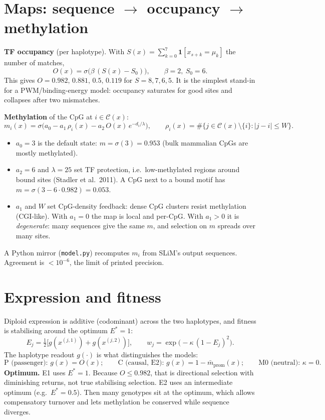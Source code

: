 \documentclass[11pt]{article}
\theoremstyle{definition}
\newcommand{\sig}{\sigma}
\begin{document}
\section{Maps: sequence $\to$ occupancy $\to$ methylation}\label{sec:maps}
\textbf{TF occupancy} (per haplotype). With $S(x)=\sum_{k=0}^{7}\mathbf{1}[x_{s+k}=\mu_k]$ the number of matches,
\begin{equation}
O(x)=\sig\!\big(\beta\,(S(x)-S_0)\big),\qquad \beta=2,\ S_0=6.
\end{equation}
This gives $O=0.982,\,0.881,\,0.5,\,0.119$ for $S=8,7,6,5$. It is the simplest stand-in for a PWM/binding-energy
model: occupancy saturates for good sites and collapses after two mismatches.

\textbf{Methylation} of the CpG at $i\in\mathcal{C}(x)$:
\begin{equation}
m_i(x)=\sig\!\Big(a_0-a_1\,\rho_i(x)-a_2\,O(x)\,e^{-d_i/\lambda}\Big),\qquad
\rho_i(x)=\#\{j\in\mathcal{C}(x)\setminus\{i\}: |j-i|\le W\}.
\label{eq:meth}
\end{equation}
\begin{itemize}
\item $a_0=3$ is the default state: $m=\sig(3)=0.953$ (bulk mammalian CpGs are mostly methylated).
\item $a_2=6$ and $\lambda=25$ set TF protection, i.e.\ low-methylated regions around bound sites (Stadler et al.\ 2011).
  A CpG next to a bound motif has $m=\sig(3-6\cdot0.982)=0.053$.
\item $a_1$ and $W$ set CpG-density feedback: dense CpG clusters resist methylation (CGI-like). With $a_1=0$ the map is
  local and per-CpG. With $a_1>0$ it is \emph{degenerate}: many sequences give the same $m$, and selection on $m$
  spreads over many sites.
\end{itemize}
A Python mirror (\texttt{model.py}) recomputes $m_i$ from SLiM's output sequences. Agreement is $<10^{-6}$, the limit
of printed precision.

\section{Expression and fitness}\label{sec:fit}
Diploid expression is additive (codominant) across the two haplotypes, and fitness is stabilising around the
optimum $E^*=1$:
\begin{equation}
E_j=\tfrac12\big[g(x^{(j,1)})+g(x^{(j,2)})\big],\qquad w_j=\exp\!\big(-\kappa\,(1-E_j)^2\big).
\end{equation}
The haplotype readout $g(\cdot)$ is what distinguishes the models:
\begin{equation}
\text{P (passenger): } g(x)=O(x);\qquad \text{C (causal, E2): } g(x)=1-\bar m_{\text{prom}}(x);\qquad
\text{M0 (neutral): } \kappa=0.
\end{equation}
\textbf{Optimum.} E1 uses $E^*=1$. Because $O\le0.982$, that is directional selection with diminishing returns,
not true stabilising selection. E2 uses an intermediate optimum (e.g.\ $E^*=0.5$). Then many genotypes sit at the
optimum, which allows compensatory turnover and lets methylation be conserved while sequence diverges.
\end{document}
